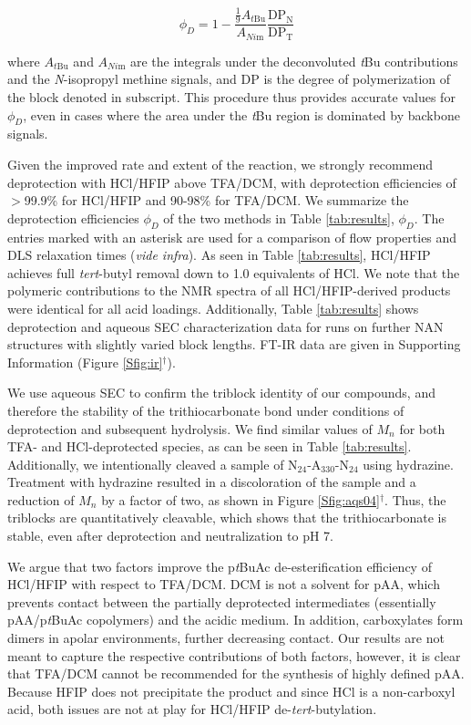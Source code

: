 \documentclass{article}
\begin{document}
\begin{equation}
\phi_D=1-\frac{\frac{1}{9}A_{t\mathrm{Bu}}}{A_{Ni\mathrm{m}}}\frac{\mathrm{DP}_\mathrm{N}}{\mathrm{DP}_\mathrm{T}}
\end{equation}

where $A_{t\mathrm{Bu}}$ and ${A_{Ni\mathrm{m}}}$ are the integrals under the 
deconvoluted \emph{t}Bu contributions and the
\emph{N}-isopropyl methine signals, and $\mathrm{DP}$ is the degree of polymerization of 
the block denoted in subscript.
This procedure thus provides accurate values for $\phi_{D}$, even in cases where the area under the 
\emph{t}Bu region is dominated by backbone signals.

Given the improved rate and extent of the reaction, we strongly recommend deprotection 
with HCl/HFIP above TFA/DCM, with deprotection efficiencies of $>$99.9\% for HCl/HFIP 
and 90-98\% for TFA/DCM. We summarize the deprotection efficiencies 
$\phi_{D}$ of the two methods in Table \ref{tab:results}, $\phi_{D}$. The entries marked with 
an asterisk are used for a comparison of flow properties and DLS relaxation times 
(\emph{vide infra}). As seen in Table \ref{tab:results}, HCl/HFIP achieves
full \emph{tert}-butyl removal down to 1.0 equivalents of HCl. We note that the polymeric contributions
to the NMR spectra of all HCl/HFIP-derived products were identical for all acid loadings.
Additionally, Table \ref{tab:results} shows deprotection and aqueous SEC characterization data for runs on 
further NAN structures with slightly varied block lengths. FT-IR data are given 
in Supporting Information (Figure \ref{Sfig:ir}$^\dag$).

We use aqueous SEC to confirm the triblock identity of our compounds, and therefore the 
stability of the trithiocarbonate 
bond under conditions of deprotection and subsequent hydrolysis. We find similar values 
of $M_{n}$ for both TFA- and HCl-deprotected
species, as can be seen in Table \ref{tab:results}. Additionally, we intentionally 
cleaved a sample of N$_\mathrm{24}$-A$_\mathrm{330}$-N$_\mathrm{24}$
using hydrazine.\cite{Shen2010} Treatment with hydrazine resulted in a discoloration of 
the sample and a reduction of $M_{n}$ by a factor
of two, as shown in Figure \ref{Sfig:aqs04}$^\dag$. Thus, the triblocks are quantitatively cleavable, 
which shows that the trithiocarbonate is stable, even after deprotection and neutralization to pH 7.

We argue that two factors improve the p\emph{t}BuAc de-esterification efficiency 
of HCl/HFIP with respect to TFA/DCM. DCM is not a solvent for pAA, which prevents
contact between the partially deprotected intermediates (essentially pAA/p\emph{t}BuAc 
copolymers) and the acidic medium. In addition, carboxylates form dimers 
in apolar environments,\cite{Fujii1988} further decreasing contact.
Our results are not meant to capture the respective contributions of both factors, 
however, it is clear that TFA/DCM cannot be recommended for the synthesis of highly 
defined pAA. Because HFIP does not precipitate the product and since HCl is a non-carboxyl
acid, both issues are not at play for HCl/HFIP de-\emph{tert}-butylation.
\end{document}

